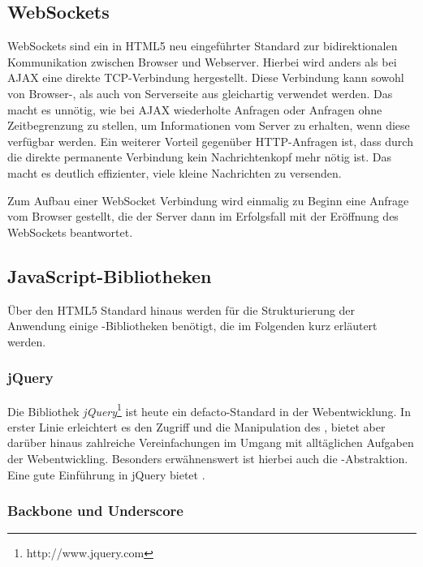 \subsection{WebSockets}

WebSockets sind ein in HTML5 neu eingeführter Standard zur bidirektionalen  Kommunikation zwischen
Browser und Webserver. Hierbei wird anders als bei  AJAX eine direkte TCP-Verbindung hergestellt.
Diese Verbindung kann sowohl von  Browser-, als auch von Serverseite aus gleichartig verwendet
werden. Das macht es  unnötig, wie bei AJAX wiederholte Anfragen oder Anfragen ohne Zeitbegrenzung
zu  stellen, um Informationen vom Server zu erhalten, wenn diese verfügbar werden. Ein weiterer
Vorteil gegenüber HTTP-Anfragen ist, dass durch die direkte permanente Verbindung kein
Nachrichtenkopf mehr nötig ist. Das macht es deutlich  effizienter, viele kleine Nachrichten zu
versenden.

Zum Aufbau einer WebSocket Verbindung wird einmalig zu Beginn eine  Anfrage vom Browser
gestellt, die der Server dann im Erfolgsfall mit der Eröffnung des WebSockets beantwortet.
\cite{websockets}

\clearpage

\subsection{JavaScript-Bibliotheken}

Über den HTML5 Standard hinaus werden für die Strukturierung der Anwendung einige
-Bibliotheken benötigt, die im Folgenden kurz erläutert werden.

\subsubsection{jQuery}

Die Bibliothek \textit{jQuery}\footnote{http://www.jquery.com} ist heute ein defacto-Standard in der
Webentwicklung. In erster Linie erleichtert es den Zugriff und die Manipulation des ,
bietet aber darüber hinaus zahlreiche Vereinfachungen im Umgang mit alltäglichen Aufgaben der
Webentwickling. Besonders erwähnenswert ist hierbei auch die -Abstraktion. Eine gute
Einführung in jQuery bietet \cite{jquery}.

\subsubsection{Backbone und Underscore}

